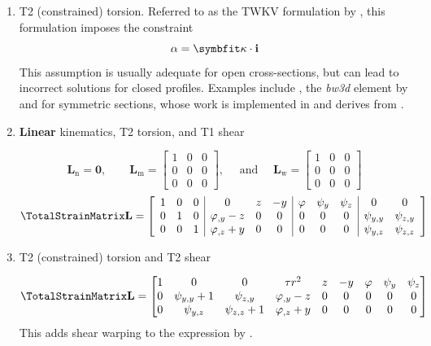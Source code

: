 \begin{enumerate}
\item T2 (constrained) torsion. Referred to as the TWKV formulation by \cite{armero2021modeling}, this formulation imposes the constraint 
  \[
  \alpha = \CurveStrain \cdot \FrameBasis
  \]
  This assumption is usually adequate for open cross-sections, but can lead to incorrect solutions for closed profiles.
  Examples include \cite{nukala2004mixed}, the \emph{bw3d} element by \cite{battini2002corotational-thesis} and \cite{zhang2011formulation} for symmetric sections, whose work is implemented in \OpenSees{} and derives from \cite{alemdar2001distributed}.

\item \textbf{Linear} kinematics, T2 torsion, and T1 shear

$$
\mathbf{L}_{\mathrm{n}} = \mathbf{0},
\qquad
\mathbf{L}_{\mathrm{m}} = \left[\begin{matrix}
1 & 0 & 0\\
0 & 0 & 0\\
0 & 0 & 0
\end{matrix}\right],
\quad\text{ and }\quad
\mathbf{L}_{\mathrm{w}} = \left[\begin{matrix}
1 & 0 & 0\\
0 & 0 & 0\\
0 & 0 & 0
\end{matrix}\right]
$$
$$
\TotalStrainMatrix\mathbf{L} = \left[\begin{array}{ccc|ccc|ccc|cc}
1 & 0 & 0 & 0 & z & - y & \varphi & \psi_{y} & \psi_{z} & 0 & 0\\
0 & 1 & 0 & \varphi_{,y} - z & 0 & 0 & 0 & 0 & 0 & \psi_{y,y} & \psi_{z,y}\\
0 & 0 & 1 & \varphi_{,z} + y & 0 & 0 & 0 & 0 & 0 & \psi_{y,z} & \psi_{z,z}\end{array}\right]
$$

\item T2 (constrained) torsion and T2 shear

$$
\TotalStrainMatrix\mathbf{L} = \left[\begin{matrix}
1 & 0 & 0 & \tau r^2 & z & - y & \varphi & \psi_{y} & \psi_{z}\\
0 & \psi_{y,y} + 1 & \psi_{z,y} & \varphi_{,y} - z & 0 & 0 & 0 & 0 & 0\\
0 & \psi_{y,z} & \psi_{z,z} + 1 & \varphi_{,z} + y & 0 & 0 & 0 & 0 & 0\end{matrix}\right]
$$
This adds shear warping to the expression by \cite{battini2002plastic}.


\end{enumerate}
